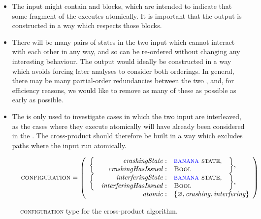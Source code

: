 \begin{itemize}
\item The input {\StateMachines} might contain {\stStartAtomic} and
  {\stEndAtomic} blocks, which are intended to indicate that some
  fragment of the {\StateMachine} executes atomically.  It is
  important that the output {\StateMachine} is constructed in a way
  which respects those blocks.
\item There will be many pairs of states in the two input
  {\StateMachines} which cannot interact with each other in any way,
  and so can be re-ordered without changing any interesting behaviour.
  The output {\StateMachine} would ideally be constructed in a way
  which avoids forcing later analyses to consider both orderings.  In
  general, there may be many partial-order redundancies\needCite{}
  between the two {\StateMachines}, and, for efficiency reasons, we
  would like to remove as many of these as possible as early as
  possible.
\item The  is only used to investigate
  cases in which the two input {\StateMachines} are interleaved, as
  the cases where they execute atomically will have already been
  considered in the .  The cross-product
  {\StateMachine} should therefore be built in a way which excludes
  paths where the input {\StateMachines} run atomically.
\end{itemize}

\begin{figure}
  \begin{displaymath}
    \textsc{configuration} = \left(\begin{array}{rrll}
      \multirow{2}{*}{\bigg\{} & \mathit{crashingState}: & \textsc{{\StateMachine} state}, & \multirow{2}{*}{\bigg\},}\\
                               & \mathit{crashingHasIssued}: & \textsc{Bool}\\
      \multirow{2}{*}{\bigg\{} & \mathit{interferingState}: & \textsc{{\StateMachine} state}, & \multirow{2}{*}{\bigg\},} \\
                               & \mathit{interferingHasIssued}: & \textsc{Bool}\\
      \multicolumn{2}{r}{\mathit{atomic}:} & \multicolumn{2}{l}{\{ \varnothing, \mathit{crashing}, \mathit{interfering} \}}
    \end{array}\right)
  \end{displaymath}
  \caption{\textsc{configuration} type for the cross-product algorithm.}
  \label{fig:cross_product:configuration}
\end{figure}

